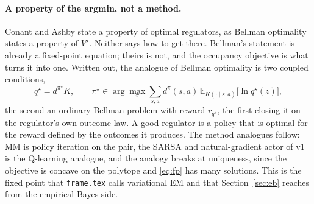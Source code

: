 \documentclass[10pt]{article}
\theoremstyle{plain}
\newcommand{\occ}{d^{\pi}}
\newcommand{\E}{\mathbb E}
\begin{document}
\paragraph{A property of the argmin, not a method.}
Conant and Ashby state a property of optimal regulators, as Bellman optimality states a property of $V^\star$.
Neither says how to get there.
Bellman's statement is already a fixed-point equation; theirs is not, and the occupancy objective is what turns it into one.
Written out, the analogue of Bellman optimality is two coupled conditions,
\begin{equation}
  q^\star = d^{\pi^\star} K,
  \qquad
  \pi^\star \in \arg\max_\pi \sum_{s,a} \occ(s,a)\, \E_{K(\cdot \mid s,a)}\big[\ln q^\star(z)\big],
  \label{eq:fp}
\end{equation}
the second an ordinary Bellman problem with reward $r_{q^\star}$, the first closing it on the regulator's own outcome law.
A good regulator is a policy that is optimal for the reward defined by the outcomes it produces.
The method analogues follow: MM is policy iteration on the pair, the SARSA and natural-gradient actor of v1 is the Q-learning analogue, and the analogy breaks at uniqueness, since the objective is concave on the polytope and \eqref{eq:fp} has many solutions.
This is the fixed point that \texttt{frame.tex} calls variational EM and that Section~\ref{sec:eb} reaches from the empirical-Bayes side.
\end{document}
